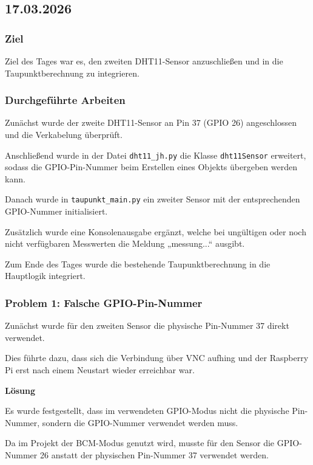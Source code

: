 \subsection{17.03.2026}

\subsubsection{Ziel}

Ziel des Tages war es, den zweiten DHT11-Sensor
anzuschließen und in die Taupunktberechnung zu integrieren.

\subsubsection{Durchgeführte Arbeiten}

Zunächst wurde der zweite DHT11-Sensor an Pin 37
(GPIO 26) angeschlossen und die Verkabelung überprüft.

Anschließend wurde in der Datei
\texttt{dht11\_jh.py} die Klasse
\texttt{dht11Sensor} erweitert, sodass die
GPIO-Pin-Nummer beim Erstellen eines Objekts
übergeben werden kann.

Danach wurde in
\texttt{taupunkt\_main.py} ein zweiter
Sensor mit der entsprechenden GPIO-Nummer
initialisiert.

Zusätzlich wurde eine Konsolenausgabe ergänzt,
welche bei ungültigen oder noch nicht verfügbaren
Messwerten die Meldung „messung...“
ausgibt.

Zum Ende des Tages wurde die bestehende
Taupunktberechnung in die Hauptlogik integriert.

\subsubsection{Problem 1: Falsche GPIO-Pin-Nummer}

Zunächst wurde für den zweiten Sensor die
physische Pin-Nummer 37 direkt verwendet.

Dies führte dazu, dass sich die Verbindung
über VNC aufhing und der Raspberry Pi erst nach
einem Neustart wieder erreichbar war.

\textbf{Lösung}

Es wurde festgestellt, dass im verwendeten
GPIO-Modus nicht die physische Pin-Nummer,
sondern die GPIO-Nummer verwendet werden muss.

Da im Projekt der BCM-Modus genutzt wird,
musste für den Sensor die GPIO-Nummer 26
anstatt der physischen Pin-Nummer 37 verwendet
werden.

